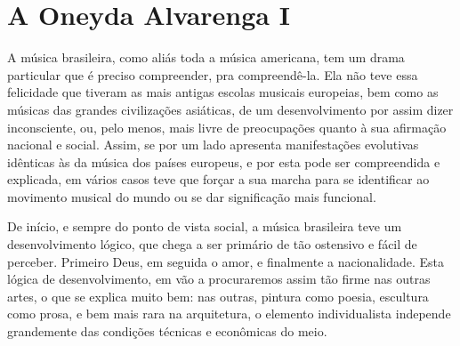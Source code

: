 


\section{A Oneyda Alvarenga I}

A música brasileira, como aliás toda a música americana, tem um drama
particular que é preciso compreender, pra compreendê-la. Ela não teve
essa felicidade que tiveram as mais antigas escolas musicais europeias,
bem como as músicas das grandes civilizações asiáticas, de um
desenvolvimento por assim dizer inconsciente, ou, pelo menos, mais livre
de preocupações quanto à sua afirmação nacional e social. Assim, se por
um lado apresenta manifestações evolutivas idênticas às da música dos
países europeus, e por esta pode ser compreendida e explicada, em vários
casos teve que forçar a sua marcha para se identificar ao movimento
musical do mundo ou se dar significação mais funcional.

De início, e sempre do ponto de vista social, a música brasileira teve
um desenvolvimento lógico, que chega a ser primário de tão ostensivo e
fácil de perceber. Primeiro Deus, em seguida o amor, e finalmente a
nacionalidade. Esta lógica de desenvolvimento, em vão a procuraremos
assim tão firme nas outras artes, o que se explica muito bem: nas
outras, pintura como poesia, escultura como prosa, e bem mais rara na
arquitetura, o elemento individualista independe grandemente das
condições técnicas e econômicas do meio.

